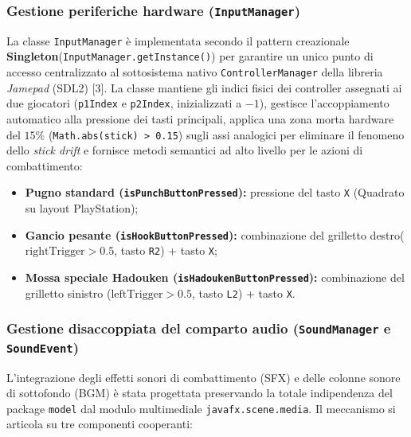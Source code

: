 \documentclass[11pt, a4paper]{article}
\begin{document}
	\subsubsection{Gestione periferiche hardware (\texttt{InputManager})}
	La classe \texttt{InputManager} è implementata secondo il pattern creazionale \textbf{Singleton}\newline(\texttt{InputManager.getInstance()}) per garantire un unico punto di accesso centralizzato al sottosistema nativo \texttt{ControllerManager} della libreria \emph{Jamepad} (SDL2) [3]. La classe mantiene gli indici fisici dei controller assegnati ai due giocatori (\texttt{p1Index} e \texttt{p2Index}, inizializzati a $-1$), gestisce l'accoppiamento automatico alla pressione dei tasti principali, applica una zona morta hardware del $15\%$ (\texttt{Math.abs(stick) > 0.15}) sugli assi analogici per eliminare il fenomeno dello \emph{stick drift} e fornisce metodi semantici ad alto livello per le azioni di combattimento:
	\begin{itemize}
		\item \textbf{Pugno standard (\texttt{isPunchButtonPressed}):} pressione del tasto \texttt{X} (Quadrato su layout PlayStation);
		\item \textbf{Gancio pesante (\texttt{isHookButtonPressed}):} combinazione del grilletto destro\newline($\text{rightTrigger} > 0.5$, tasto \texttt{R2}) + tasto \texttt{X};
		\item \textbf{Mossa speciale Hadouken (\texttt{isHadoukenButtonPressed}):} combinazione del grilletto sinistro ($\text{leftTrigger} > 0.5$, tasto \texttt{L2}) + tasto \texttt{X}.
	\end{itemize}
	
	\subsubsection{Gestione disaccoppiata del comparto audio (\texttt{SoundManager} e \texttt{SoundEvent})}\label{sec:audio}
	L'integrazione degli effetti sonori di combattimento (SFX) e delle colonne sonore di sottofondo (BGM) è stata progettata preservando la totale indipendenza del package \texttt{model} dal modulo multimediale \texttt{javafx.scene.media}. Il meccanismo si articola su tre componenti cooperanti:
	
\end{document}
